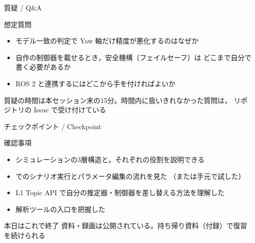 \begin{frame}{質疑 / Q\&A}
  \begin{block}{想定質問}\small
    \begin{itemize}
      \item モデル一致の判定で Yaw 軸だけ精度が悪化するのはなぜか
      \item 自作の制御器を載せるとき，安全機構（フェイルセーフ）は
            どこまで自分で書く必要があるか
      \item ROS 2 と連携するにはどこから手を付ければよいか
    \end{itemize}
  \end{block}

  \vspace{0.5em}

  {\small 質疑の時間は本セッション末の15分。時間内に扱いきれなかった質問は，
  リポジトリの Issue で受け付けている}
\end{frame}

\begin{frame}{チェックポイント / Checkpoint}
  \begin{alertblock}{確認事項}\small
    \begin{itemize}
      \item[$\square$] シミュレーションの3層構造と，それぞれの役割を説明できる
      \item[$\square$]  でのシナリオ実行とパラメータ編集の流れを見た
            （または手元で試した）
      \item[$\square$] L1 Topic API で自分の推定器・制御器を差し替える方法を理解した
      \item[$\square$] 解析ツールの入口を把握した
    \end{itemize}
  \end{alertblock}

  \vspace{0.1em}

  \begin{block}{本日はこれで終了}
    資料・録画は公開されている。持ち帰り資料（付録）で復習を続けられる
  \end{block}
\end{frame}
